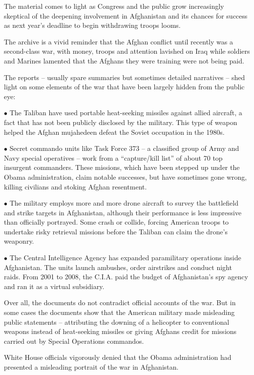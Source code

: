 ﻿\documentclass[12pt]{article}
\begin{document}
The material comes to light as Congress and the public grow increasingly skeptical of the deepening
involvement in Afghanistan and its chances for success as next year's deadline to begin withdrawing
troops looms.

The archive is a vivid reminder that the Afghan conflict until recently was a second-class war, with
money, troops and attention lavished on Iraq while soldiers and Marines lamented that the Afghans
they were training were not being paid.

The reports -- usually spare summaries but sometimes detailed narratives -- shed light on some
elements of the war that have been largely hidden from the public eye:

$\bullet$ The Taliban have used portable heat-seeking missiles against allied aircraft, a fact
that has not been publicly disclosed by the military. This type of weapon helped the Afghan
mujahedeen defeat the Soviet occupation in the 1980s.

$\bullet$ Secret commando units like Task Force 373 -- a classified group of Army and Navy special
operatives -- work from a ``capture/kill list'' of about 70 top insurgent commanders. These
missions, which have been stepped up under the Obama administration, claim notable successes, but
have sometimes gone wrong, killing civilians and stoking Afghan resentment.

$\bullet$ The military employs more and more drone aircraft to survey the battlefield and strike
targets in Afghanistan, although their performance is less impressive than officially portrayed.
Some crash or collide, forcing American troops to undertake risky retrieval missions before the
Taliban can claim the drone's weaponry.

$\bullet$ The Central Intelligence Agency has expanded paramilitary operations inside Afghanistan.
The units launch ambushes, order airstrikes and conduct night raids. From 2001 to 2008, the C.I.A.
paid the budget of Afghanistan's spy agency and ran it as a virtual subsidiary.

Over all, the documents do not contradict official accounts of the war. But in some cases the
documents show that the American military made misleading public statements -- attributing the
downing of a helicopter to conventional weapons instead of heat-seeking missiles or giving Afghans
credit for missions carried out by Special Operations commandos.

White House officials vigorously denied that the Obama administration had presented a misleading
portrait of the war in Afghanistan.
\end{document}
